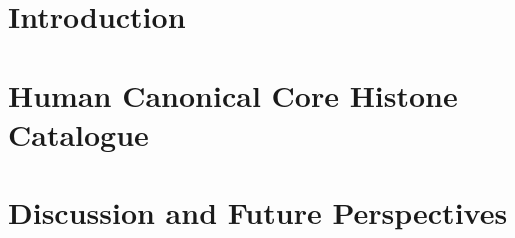 \documentclass[a4paper,twoside,openright,draft]{memoir}
\begin{document}
  \mainmatter

  \chapter{Introduction}

  

  \chapter{Human Canonical Core Histone Catalogue}
  \label{ch:histone-catalogue}
  \begingroup
  \newcommand{\ResultsDir}{results-homo-sapiens}
  \newcommand{\FigsDir}{figs-homo-sapiens}
  \newcommand{\ReferenceDir}{data/reference-homo-sapiens}
  \endgroup

  
  

  \chapter{Discussion and Future Perspectives}

  

  \backmatter

  
\end{document}
